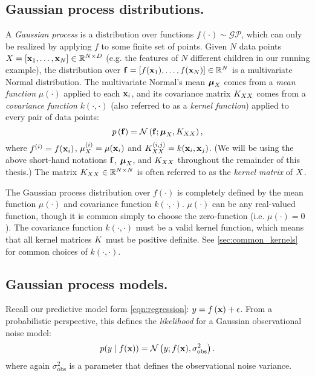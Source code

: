 \subsection{Gaussian process distributions.}
A \emph{Gaussian process} is a distribution over functions $f(\cdot) \sim \mathcal{GP}$, which can only be realized by applying $f$ to some finite set of points.
Given $N$ data points $X = [ \mathbf{x}_1, \ldots, \mathbf{x}_N ] \in \mathbb{R}^{N \times D}$ (e.g. the features of $N$ different children in our running example), the distribution over $\mathbf{f} = [ f(\mathbf{x}_1), \ldots, f(\mathbf{x}_N) ] \in \mathbb{R}^{N}$ is a multivariate Normal distribution.
The multivariate Normal's mean $\boldsymbol{\mu}_{X}$ comes from a \emph{mean function} $\mu(\cdot)$ applied to each $\mathbf{x}_i$, and its covariance matrix $K_{XX}$ comes from a \emph{covariance function} $k(\cdot, \cdot)$ (also referred to as a \emph{kernel function}) applied to every pair of data points:
\begin{equation}
 p \left( \mathbf{f} \right) = \mathcal{N} \left(  \mathbf{f} ; \boldsymbol{\mu}_{X},  K_{XX}  \right),
 \label{eqn:prior_finite}
\end{equation}
where $f^{(i)} = f(\mathbf{x}_i)$, $\mu^{(i)}_{X} = \mu( \mathbf{x}_i )$ and $K_{XX}^{(i,j)} = k(\mathbf{x}_i, \mathbf{x}_j)$.
(We will be using the above short-hand notations $\mathbf{f}$, $\boldsymbol{\mu}_{X}$, and $K_{XX}$ throughout the remainder of this thesis.)
The matrix $K_{XX} \in \mathbb{R}^{N \times N}$ is often referred to as the \emph{kernel matrix} of $X$.

The Gaussian process distribution over $f(\cdot)$ is completely defined by the mean function $\mu(\cdot)$ and covariance function $k(\cdot, \cdot)$.
$\mu(\cdot)$ can be any real-valued function, though it is common simply to choose the zero-function (i.e. $\mu(\cdot) = 0$).
The covariance function $k(\cdot, \cdot)$ must be a valid kernel function, which means that all kernel matrices $K$ must be positive definite.
See \autoref{sec:common_kernels} for common choices of $k(\cdot, \cdot)$.

\subsection{Gaussian process models.}
Recall our predictive model form \autoref{eqn:regression}: $y = f \left( \mathbf{x} \right) + \epsilon$.
From a probabilistic perspective, this defines the \emph{likelihood} for a Gaussian observational noise model:
%
\begin{equation}
  p(y \mid f(\mathbf{x})) = \mathcal{N} \left(  y; f(\mathbf{x}), \sigma^2_\text{obs} \right).
  \label{eqn:likelihood}
\end{equation}
%
where again $\sigma^2_\text{obs}$ is a parameter that defines the observational noise variance.

